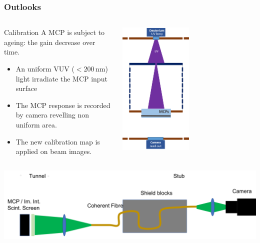 \begin{frame}
  \frametitle{Outlooks}
  \begin{columns}[T]
    \begin{column}{0.45\textwidth}
      \begin{block}{Calibration}
        A MCP is subject to ageing: the gain decrease over time.
        \begin{itemize}
          \item An uniform VUV ($<200\,\mathrm{nm}$) light irradiate the MCP input surface
          \item The MCP response is recorded by camera revelling non uniform area.
          \item The new calibration map is applied on beam images.
        \end{itemize}
      \end{block}
    \end{column}
    \begin{column}{0.45\textwidth}
      \begin{center}
        \includegraphics[width=0.5\textwidth]{05_Conclusion/fig/fig000_UV_calib}
      \end{center}
    \end{column}
  \end{columns}
  \begin{columns}[T]
    \begin{column}{0.60\textwidth}
      \includegraphics[width=1\textwidth]{05_Conclusion/fig/fig000_schematic_coherentr_fiber}

\end{column}
\end{columns}
\end{frame}
